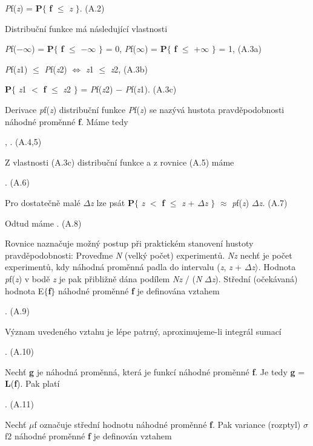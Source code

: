 \textit{P}f(\textit{z}) = \textbf{P}$\{$ \textbf{f} $\leq$ \textit{z} $\}$. (A.2)

\noindent Distribuční funkce má následující vlastnosti

 \textit{P}f($-$$\infty$) = \textbf{P}$\{$ \textbf{f} $\leq$ $-$$\infty$ $\}$ = 0,     \textit{P}f($\infty$) = \textbf{P}$\{$ \textbf{f} $\leq$ +$\infty$ $\}$ = 1, (A.3a)

 \textit{P}f(\textit{z}1) $\leq$ \textit{P}f(\textit{z}2)   $\Leftrightarrow$   \textit{z}1 $\leq$ \textit{z}2, (A.3b)

\textbf{ P}$\{$ \textit{z}1 $<$ \textbf{f} $\leq$ \textit{z}2 $\}$ = \textit{P}f(\textit{z}2) $-$ \textit{P}f(\textit{z}1). (A.3c)

\noindent Derivace \textit{p}f(\textit{z}) distribuční funkce\textit{ P}f(\textit{z}) se nazývá hustota pravděpodobnosti náhodné proměnné \textbf{f}. Máme tedy

 ,     . (A.4,5)

\noindent Z vlastnosti (A.3c) distribuční funkce a z rovnice (A.5) máme

 . (A.6)

\noindent Pro dostatečně malé $\Delta$\textit{z} lze psát\textbf{ P}$\{$ \textit{z} $<$ \textbf{f} $\leq$ \textit{z} + $\Delta$\textit{z} $\}$ $\approx$ \textit{p}f(\textit{z}) $\Delta$\textit{z.} (A.7)

\noindent Odtud máme . (A.8)

\noindent Rovnice naznačuje možný postup při praktickém stanovení hustoty pravděpodobnosti: Proveďme \textit{N} (velký počet) experimentů. \textit{Nz} nechť je počet experimentů, kdy náhodná proměnná padla do intervalu  (\textit{z}, \textit{z} + $\Delta$\textit{z}$\rangle$. Hodnota \textit{p}f(\textit{z}) v bodě \textit{z} je pak přibližně dána podílem \textit{Nz} / (\textit{N} $\Delta$\textit{z}). Střední (očekávaná) hodnota E$\{$\textbf{f}$\}$ náhodné proměnné \textbf{f} je definována vztahem

 . (A.9)

\noindent Význam uvedeného vztahu je lépe patrný, aproximujeme-li integrál sumací

 . (A.10)

\noindent Nechť \textbf{g} je náhodná proměnná, která je funkcí náhodné proměnné \textbf{f}. Je tedy \textbf{g} = \textbf{L}(\textbf{f}). Pak platí

 . (A.11)

\noindent Nechť $\mu$f označuje střední hodnotu náhodné proměnné \textbf{f}. Pak variance (rozptyl) $\sigma$f2 náhodné proměnné \textbf{f} je definován vztahem

